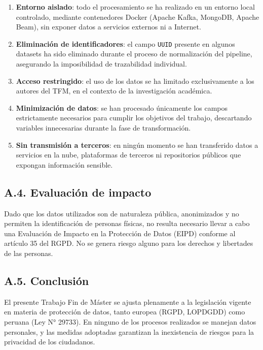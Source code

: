 \documentclass[12pt,a4paper]{article}
\providecommand{\tightlist}{%
  \setlength{\itemsep}{0pt}\setlength{\parskip}{0pt}}
\begin{document}
\begin{enumerate}
    \tightlist
    \item \textbf{Entorno aislado}: todo el procesamiento se ha realizado en un entorno local controlado, mediante contenedores Docker (Apache Kafka, MongoDB, Apache Beam), sin exponer datos a servicios externos ni a Internet.
    \item \textbf{Eliminación de identificadores}: el campo \texttt{UUID} presente en algunos datasets ha sido eliminado durante el proceso de normalización del pipeline, asegurando la imposibilidad de trazabilidad individual.
    \item \textbf{Acceso restringido}: el uso de los datos se ha limitado exclusivamente a los autores del TFM, en el contexto de la investigación académica.
    \item \textbf{Minimización de datos}: se han procesado únicamente los campos estrictamente necesarios para cumplir los objetivos del trabajo, descartando variables innecesarias durante la fase de transformación.
    \item \textbf{Sin transmisión a terceros}: en ningún momento se han transferido datos a servicios en la nube, plataformas de terceros ni repositorios públicos que expongan información sensible.
\end{enumerate}

\subsection*{A.4. Evaluación de impacto}

Dado que los datos utilizados son de naturaleza pública, anonimizados y no permiten la identificación de personas físicas, no resulta necesario llevar a cabo una Evaluación de Impacto en la Protección de Datos (EIPD) conforme al artículo 35 del RGPD. No se genera riesgo alguno para los derechos y libertades de las personas.

\subsection*{A.5. Conclusión}

El presente Trabajo Fin de Máster se ajusta plenamente a la legislación vigente en materia de protección de datos, tanto europea (RGPD, LOPDGDD) como peruana (Ley N° 29733). En ninguno de los procesos realizados se manejan datos personales, y las medidas adoptadas garantizan la inexistencia de riesgos para la privacidad de los ciudadanos.
\end{document}
